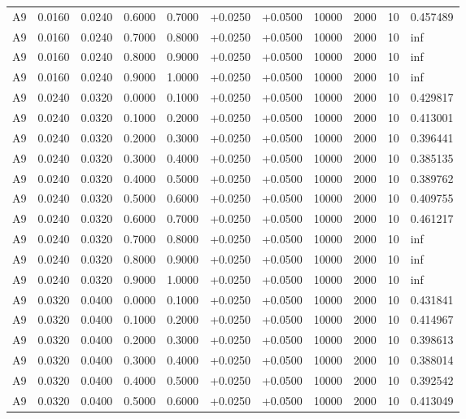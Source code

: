 \documentclass{article}
\begin{document}
\begin{longtable}{l r r r r r r r r r l}
A9 & 0.0160 & 0.0240 & 0.6000 & 0.7000 & +0.0250 & +0.0500 & 10000 & 2000 & 10 & 0.457489 \\
A9 & 0.0160 & 0.0240 & 0.7000 & 0.8000 & +0.0250 & +0.0500 & 10000 & 2000 & 10 & inf \\
A9 & 0.0160 & 0.0240 & 0.8000 & 0.9000 & +0.0250 & +0.0500 & 10000 & 2000 & 10 & inf \\
A9 & 0.0160 & 0.0240 & 0.9000 & 1.0000 & +0.0250 & +0.0500 & 10000 & 2000 & 10 & inf \\
A9 & 0.0240 & 0.0320 & 0.0000 & 0.1000 & +0.0250 & +0.0500 & 10000 & 2000 & 10 & 0.429817 \\
A9 & 0.0240 & 0.0320 & 0.1000 & 0.2000 & +0.0250 & +0.0500 & 10000 & 2000 & 10 & 0.413001 \\
A9 & 0.0240 & 0.0320 & 0.2000 & 0.3000 & +0.0250 & +0.0500 & 10000 & 2000 & 10 & 0.396441 \\
A9 & 0.0240 & 0.0320 & 0.3000 & 0.4000 & +0.0250 & +0.0500 & 10000 & 2000 & 10 & 0.385135 \\
A9 & 0.0240 & 0.0320 & 0.4000 & 0.5000 & +0.0250 & +0.0500 & 10000 & 2000 & 10 & 0.389762 \\
A9 & 0.0240 & 0.0320 & 0.5000 & 0.6000 & +0.0250 & +0.0500 & 10000 & 2000 & 10 & 0.409755 \\
A9 & 0.0240 & 0.0320 & 0.6000 & 0.7000 & +0.0250 & +0.0500 & 10000 & 2000 & 10 & 0.461217 \\
A9 & 0.0240 & 0.0320 & 0.7000 & 0.8000 & +0.0250 & +0.0500 & 10000 & 2000 & 10 & inf \\
A9 & 0.0240 & 0.0320 & 0.8000 & 0.9000 & +0.0250 & +0.0500 & 10000 & 2000 & 10 & inf \\
A9 & 0.0240 & 0.0320 & 0.9000 & 1.0000 & +0.0250 & +0.0500 & 10000 & 2000 & 10 & inf \\
A9 & 0.0320 & 0.0400 & 0.0000 & 0.1000 & +0.0250 & +0.0500 & 10000 & 2000 & 10 & 0.431841 \\
A9 & 0.0320 & 0.0400 & 0.1000 & 0.2000 & +0.0250 & +0.0500 & 10000 & 2000 & 10 & 0.414967 \\
A9 & 0.0320 & 0.0400 & 0.2000 & 0.3000 & +0.0250 & +0.0500 & 10000 & 2000 & 10 & 0.398613 \\
A9 & 0.0320 & 0.0400 & 0.3000 & 0.4000 & +0.0250 & +0.0500 & 10000 & 2000 & 10 & 0.388014 \\
A9 & 0.0320 & 0.0400 & 0.4000 & 0.5000 & +0.0250 & +0.0500 & 10000 & 2000 & 10 & 0.392542 \\
A9 & 0.0320 & 0.0400 & 0.5000 & 0.6000 & +0.0250 & +0.0500 & 10000 & 2000 & 10 & 0.413049 \\

\end{longtable}
\end{document}
